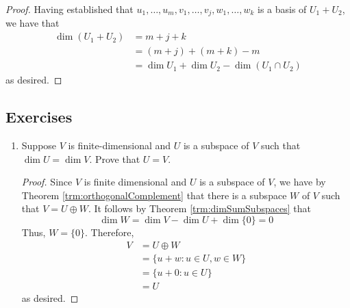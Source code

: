 \documentclass[../main.tex]{subfiles}
\begin{document}
\begin{itemize}
\begin{theorem}
\begin{proof}
            Having established that $u_1,\dots,u_m,v_1,\dots,v_j,w_1,\dots,w_k$ is a basis of $U_1+U_2$, we have that
            \begin{align*}
                \dim(U_1+U_2) &= m+j+k\\
                &= (m+j)+(m+k)-m\\
                &= \dim U_1+\dim U_2-\dim(U_1\cap U_2)
            \end{align*}
            as desired.
        \end{proof}
    \end{theorem}
\end{itemize}


\subsection*{Exercises}
\begin{enumerate}[label={\textbf{\arabic*}},labelsep=1em,ref={\thesection.\arabic*}]
    \item \label{exr:subspaceSameDim}Suppose $V$ is finite-dimensional and $U$ is a subspace of $V$ such that $\dim U=\dim V$. Prove that $U=V$.
    \begin{proof}
        Since $V$ is finite dimensional and $U$ is a subspace of $V$, we have by Theorem \ref{trm:orthogonalComplement} that there is a subspace $W$ of $V$ such that $V=U\oplus W$. It follows by Theorem \ref{trm:dimSumSubspaces} that
        \begin{equation*}
            \dim W = \dim V-\dim U+\dim\{0\} = 0
        \end{equation*}
        Thus, $W=\{0\}$. Therefore,
        \begin{align*}
            V &= U\oplus W\\
            &= \{u+w:u\in U,w\in W\}\\
            &= \{u+0:u\in U\}\\
            &= U
        \end{align*}
        as desired.
    \end{proof}
\end{enumerate}
\end{document}
